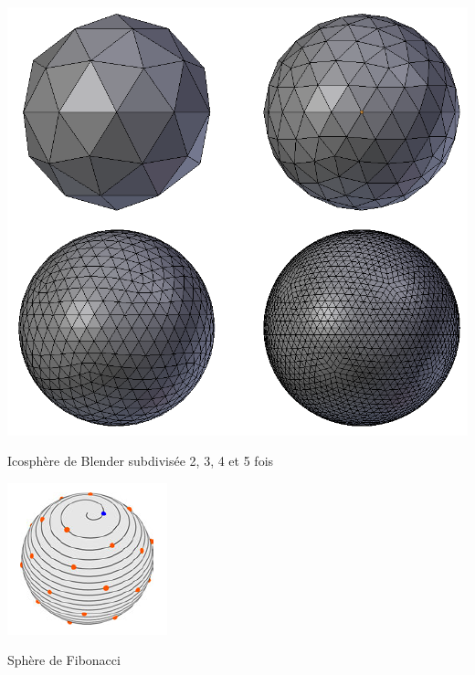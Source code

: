 \begin{figureth}
	\begin{subfigureth}{0.45\textwidth}
		\includegraphics[width=\linewidth]{images/icosphere}
		\caption{Icosphère de Blender subdivisée 2, 3, 4 et 5 fois}
		\label{icosphere}
	\end{subfigureth}
	\qquad
	\begin{subfigureth}{0.45\textwidth}
		\includegraphics[width=\linewidth]{images/fibonacci}
		\caption[Sphère de Fibonacci]{Sphère de Fibonacci \footnotemark}
		\label{fibonacci}
	\end{subfigureth}
\end{figureth}

